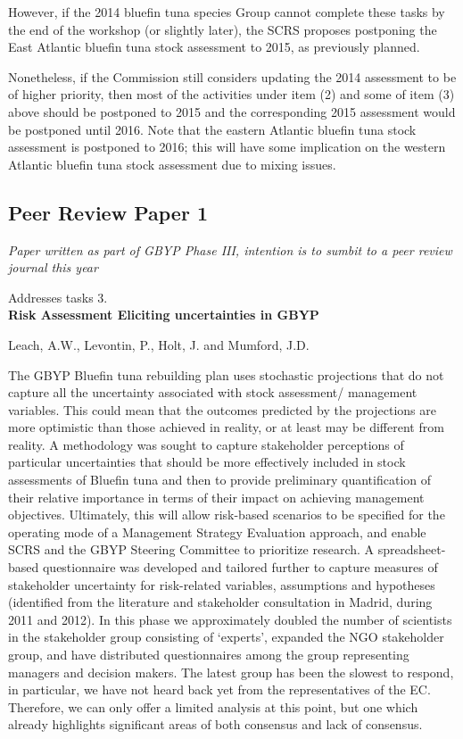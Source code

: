 However, if the 2014 bluefin tuna species Group cannot complete these tasks by the end of the workshop (or slightly later), the SCRS proposes postponing the East Atlantic bluefin tuna stock assessment to 2015, as previously planned. 

Nonetheless, if the Commission still considers updating the 2014 assessment to be of higher priority, then most of the activities under item (2) and some of item (3) above should be postponed to 2015 and the corresponding 2015 assessment would be postponed until 2016. Note that the eastern Atlantic bluefin tuna stock assessment is postponed to 2016; this will have some implication on the western Atlantic bluefin tuna stock assessment due to mixing issues. 




\subsection{Peer Review Paper 1}

\textit{Paper written as part of GBYP Phase III, intention is to sumbit to a peer review journal this year\\}

Addresses tasks  3.\\

\textbf{Risk Assessment Eliciting uncertainties in GBYP}

Leach, A.W., Levontin, P., Holt, J. and Mumford, J.D.


The GBYP Bluefin tuna rebuilding plan uses stochastic projections that do not capture all the
uncertainty associated with stock assessment/ management variables. This could mean that the
outcomes predicted by the projections are more optimistic than those achieved in reality, or at
least may be different from reality. A methodology was sought to capture stakeholder
perceptions of particular uncertainties that should be more effectively included in stock
assessments of Bluefin tuna and then to provide preliminary quantification of their relative
importance in terms of their impact on achieving management objectives. Ultimately, this will
allow risk-based scenarios to be specified for the operating mode of a Management Strategy
Evaluation approach, and enable SCRS and the GBYP Steering Committee to prioritize
research. A spreadsheet-based questionnaire was developed and tailored further to capture
measures of stakeholder uncertainty for risk-related variables, assumptions and hypotheses
(identified from the literature and stakeholder consultation in Madrid, during 2011 and 2012).
In this phase we approximately doubled the number of scientists in the stakeholder group
consisting of ‘experts’, expanded the NGO stakeholder group, and have distributed
questionnaires among the group representing managers and decision makers. The latest group
has been the slowest to respond, in particular, we have not heard back yet from the
representatives of the EC. Therefore, we can only offer a limited analysis at this point, but one
which already highlights significant areas of both consensus and lack of consensus.


